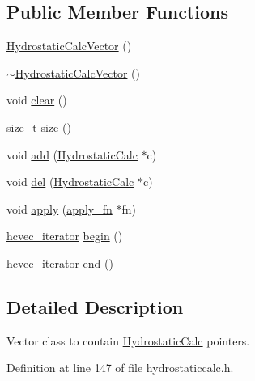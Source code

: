 \subsection*{Public Member Functions}
\begin{DoxyCompactItemize}
\item 
\hyperlink{classShipCAD_1_1HydrostaticCalcVector_ac84eac37273d6a27caad7b2f94847216}{Hydrostatic\-Calc\-Vector} ()
\item 
\hyperlink{classShipCAD_1_1HydrostaticCalcVector_a10eba05b4acd39b164a4ba6e11491958}{$\sim$\-Hydrostatic\-Calc\-Vector} ()
\item 
void \hyperlink{classShipCAD_1_1HydrostaticCalcVector_a71af534d81b0b5db486df16087e3a2fa}{clear} ()
\item 
size\-\_\-t \hyperlink{classShipCAD_1_1HydrostaticCalcVector_a9feb9efeaffa3b234bdf7f973f1ecc91}{size} ()
\item 
void \hyperlink{classShipCAD_1_1HydrostaticCalcVector_a790f16cb4b2651b45339cb27b3504e9b}{add} (\hyperlink{classShipCAD_1_1HydrostaticCalc}{Hydrostatic\-Calc} $\ast$c)
\item 
void \hyperlink{classShipCAD_1_1HydrostaticCalcVector_a019be1da2cf5fd1e4a39a3459796bf10}{del} (\hyperlink{classShipCAD_1_1HydrostaticCalc}{Hydrostatic\-Calc} $\ast$c)
\item 
void \hyperlink{classShipCAD_1_1HydrostaticCalcVector_a539b31c0a3423f25368144f7050fb67e}{apply} (\hyperlink{classShipCAD_1_1HydrostaticCalcVector_aba4bf648866d2fee843a3b1f3b366522}{apply\-\_\-fn} $\ast$fn)
\item 
\hyperlink{classShipCAD_1_1HydrostaticCalcVector_aecdea2f034955ae53b4d0855332491e5}{hcvec\-\_\-iterator} \hyperlink{classShipCAD_1_1HydrostaticCalcVector_a402ad58dee97fecd54c00f15e836a38e}{begin} ()
\item 
\hyperlink{classShipCAD_1_1HydrostaticCalcVector_aecdea2f034955ae53b4d0855332491e5}{hcvec\-\_\-iterator} \hyperlink{classShipCAD_1_1HydrostaticCalcVector_a379ea252c1f9faaf0a78c8661fc16589}{end} ()
\end{DoxyCompactItemize}


\subsection{Detailed Description}
Vector class to contain \hyperlink{classShipCAD_1_1HydrostaticCalc}{Hydrostatic\-Calc} pointers. 



Definition at line 147 of file hydrostaticcalc.\-h.



